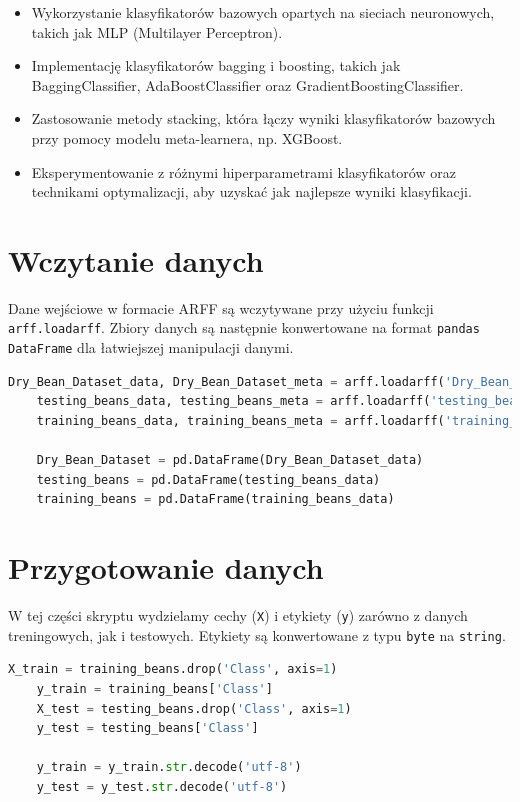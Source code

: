 \documentclass[polish,11pt,a4paper]{article}
\begin{document}
\begin{itemize}
	\item Wykorzystanie klasyfikatorów bazowych opartych na sieciach neuronowych, takich jak MLP (Multilayer Perceptron).
	\item Implementację klasyfikatorów bagging i boosting, takich jak BaggingClassifier, AdaBoostClassifier oraz GradientBoostingClassifier.
	\item Zastosowanie metody stacking, która łączy wyniki klasyfikatorów bazowych przy pomocy modelu meta-learnera, np. XGBoost.
	\item Eksperymentowanie z różnymi hiperparametrami klasyfikatorów oraz technikami optymalizacji, aby uzyskać jak najlepsze wyniki klasyfikacji.
\end{itemize}

\section{Wczytanie danych}
Dane wejściowe w formacie ARFF są wczytywane przy użyciu funkcji \texttt{arff.loadarff}. Zbiory danych są następnie konwertowane na format \texttt{pandas DataFrame} dla łatwiejszej manipulacji danymi.

\begin{lstlisting}[language=Python]
	Dry_Bean_Dataset_data, Dry_Bean_Dataset_meta = arff.loadarff('Dry_Bean_Dataset.arff')
	testing_beans_data, testing_beans_meta = arff.loadarff('testing_beans.arff')
	training_beans_data, training_beans_meta = arff.loadarff('training_beans.arff')
	
	Dry_Bean_Dataset = pd.DataFrame(Dry_Bean_Dataset_data)
	testing_beans = pd.DataFrame(testing_beans_data)
	training_beans = pd.DataFrame(training_beans_data)
\end{lstlisting}

\section{Przygotowanie danych}
W tej części skryptu wydzielamy cechy (\texttt{X}) i etykiety (\texttt{y}) zarówno z danych treningowych, jak i testowych. Etykiety są konwertowane z typu \texttt{byte} na \texttt{string}.

\begin{lstlisting}[language=Python]
	X_train = training_beans.drop('Class', axis=1)
	y_train = training_beans['Class']
	X_test = testing_beans.drop('Class', axis=1)  
	y_test = testing_beans['Class']

	y_train = y_train.str.decode('utf-8')  
	y_test = y_test.str.decode('utf-8')
\end{lstlisting}
\end{document}

